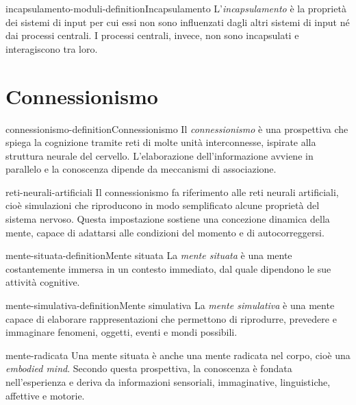 \documentclass[preview]{standalone}
\begin{document}
\begin{snippetdefinition}{incapsulamento-moduli-definition}{Incapsulamento}
    L'\emph{incapsulamento} è la proprietà dei sistemi di input per cui essi
    non sono influenzati dagli altri sistemi di input né dai processi centrali.
    I processi centrali, invece, non sono incapsulati e interagiscono tra loro.
\end{snippetdefinition}

\section{Connessionismo}

\begin{snippetdefinition}{connessionismo-definition}{Connessionismo}
    Il \emph{connessionismo} è una prospettiva che spiega la cognizione tramite
    reti di molte unità interconnesse, ispirate alla struttura neurale del
    cervello. L'elaborazione dell'informazione avviene in parallelo e la
    conoscenza dipende da meccanismi di associazione.
\end{snippetdefinition}

\begin{snippet}{reti-neurali-artificiali}
    Il connessionismo fa riferimento alle reti neurali artificiali, cioè
    simulazioni che riproducono in modo semplificato alcune proprietà del
    sistema nervoso. Questa impostazione sostiene una concezione dinamica della
    mente, capace di adattarsi alle condizioni del momento e di autocorreggersi.
\end{snippet}


\begin{snippetdefinition}{mente-situata-definition}{Mente situata}
    La \emph{mente situata} è una mente costantemente immersa in un contesto
    immediato, dal quale dipendono le sue attività cognitive.
\end{snippetdefinition}

\begin{snippetdefinition}{mente-simulativa-definition}{Mente simulativa}
    La \emph{mente simulativa} è una mente capace di elaborare rappresentazioni
    che permettono di riprodurre, prevedere e immaginare fenomeni, oggetti,
    eventi e mondi possibili.
\end{snippetdefinition}

\begin{snippet}{mente-radicata}
    Una mente situata è anche una mente radicata nel corpo, cioè una
    \emph{embodied mind}. Secondo questa prospettiva, la conoscenza è fondata
    nell'esperienza e deriva da informazioni sensoriali, immaginative,
    linguistiche, affettive e motorie.
\end{snippet}
\end{document}
